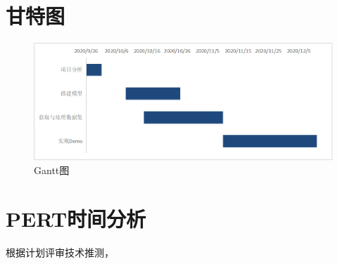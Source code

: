 \documentclass[
  hyperref, a4paper]{ctexart}
\begin{document}
\hypertarget{ux7518ux7279ux56fe}{%
\section{甘特图}\label{ux7518ux7279ux56fe}}

\begin{figure}
\centering
\includegraphics{3.png}
\caption{Gantt图}
\end{figure}

\hypertarget{pertux65f6ux95f4ux5206ux6790}{%
\section{PERT时间分析}\label{pertux65f6ux95f4ux5206ux6790}}

根据计划评审技术推测，
\end{document}
